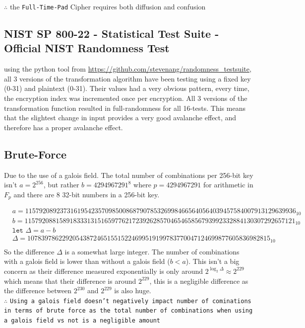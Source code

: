 \documentclass[fleqn, a4paper,12pt]{article}
\begin{document}
$\therefore$ the \texttt{Full-Time-Pad} Cipher requires both diffusion and confusion

\subsection {NIST SP 800-22 - Statistical Test Suite - Official NIST Randomness Test}

using the python tool from \href{https://github.com/stevenang/randomness\_testsuite}{https://github.com/stevenang/randomness\_testsuite}, all 3 versions of the transformation algorithm have been testing using a fixed key (0-31) and plaintext (0-31). Their values had a very obvious pattern, every time, the encryption index was incremented once per encryption. All 3 versions of the transformation function resulted in full-randomness for all 16-tests. This means that the slightest change in input provides a very good avalanche effect, and therefore has a proper avalanche effect.

\subsection{Brute-Force}

Due to the use of a galois field. The total number of combinations per 256-bit key isn't $a=2^{256}$, but rather $b=4294967291^8$ where $p=4294967291$ for arithmetic in $F_p$ and there are 8 32-bit numbers in a 256-bit key.

\[
\begin{aligned}
&a = 115792089237316195423570985008687907853269984665640564039457584007913129639936_{10} \\
&b = 115792088158918333131516597762172392628570465465856793992332884130307292657121_{10} \\
&\texttt{let  } \Delta = a-b \\
&\Delta = 1078397862292054387246515515224699519199783770047124699877605836982815_{10} \\
\end{aligned}
\]
So the difference $\Delta$ is a somewhat large integer. The number of combinations with a galois field is lower than without a galois field ($b < a$). This isn't a big concern as their difference measured exponentially is only around $2^{\log_2\Delta} \approx 2^{229}$ which means that their difference is around $2^{229}$, this is a negligible difference as the difference between $2^{230}$ and $2^{229}$ is also huge. \\
$\therefore $ \texttt{Using a galois field doesn't negatively impact number of cominations in terms of brute force as the total number of combinations when using a galois field vs not is a negligible amount}
\end{document}
